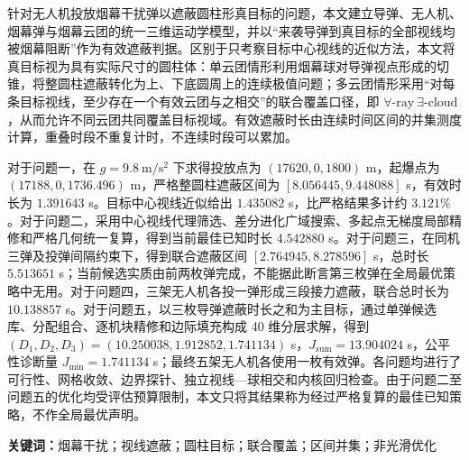 
针对无人机投放烟幕干扰弹以遮蔽圆柱形真目标的问题，本文建立导弹、无人机、烟幕弹与烟幕云团的统一三维运动学模型，并以“来袭导弹到真目标的全部视线均被烟幕阻断”作为有效遮蔽判据。区别于只考察目标中心视线的近似方法，本文将真目标视为具有实际尺寸的圆柱体：单云团情形利用烟幕球对导弹视点形成的切锥，将整圆柱遮蔽转化为上、下底圆周上的连续极值问题；多云团情形采用“对每条目标视线，至少存在一个有效云团与之相交”的联合覆盖口径，即 $\forall\text{-ray}\ \exists\text{-cloud}$，从而允许不同云团共同覆盖目标视域。有效遮蔽时长由连续时间区间的并集测度计算，重叠时段不重复计时，不连续时段可以累加。

对于问题一，在 $g=9.8\ \mathrm{m/s^2}$ 下求得投放点为 $(17620,0,1800)$ m，起爆点为 $(17188,0,1736.496)$ m，严格整圆柱遮蔽区间为 $[8.056445,\allowbreak{}9.448088]$ s，有效时长为 $1.391643$ s。目标中心视线近似给出 $1.435082$ s，比严格结果多计约 $3.121\%$。对于问题二，采用中心视线代理筛选、差分进化广域搜索、多起点无梯度局部精修和严格几何统一复算，得到当前最佳已知时长 $4.542880$ s。对于问题三，在同机三弹及投弹间隔约束下，得到联合遮蔽区间 $[2.764945,\allowbreak{}8.278596]$ s，总时长 $5.513651$ s；当前候选实质由前两枚弹完成，不能据此断言第三枚弹在全局最优策略中无用。对于问题四，三架无人机各投一弹形成三段接力遮蔽，联合总时长为 $10.138857$ s。对于问题五，以三枚导弹遮蔽时长之和为主目标，通过单弹候选库、分配组合、逐机块精修和边际填充构成 40 维分层求解，得到 $(D_1,\allowbreak{}D_2,\allowbreak{}D_3)=(10.250038,\allowbreak{}1.912852,\allowbreak{}1.741134)$ s，$J_{\mathrm{sum}}=13.904024$ s，公平性诊断量 $J_{\min}=1.741134$ s；最终五架无人机各使用一枚有效弹。各问题均进行了可行性、网格收敛、边界探针、独立视线—球相交和内核回归检查。由于问题二至问题五的优化均受评估预算限制，本文只将其结果称为经过严格复算的最佳已知策略，不作全局最优声明。


\noindent\textbf{关键词：}烟幕干扰；视线遮蔽；圆柱目标；联合覆盖；区间并集；非光滑优化
